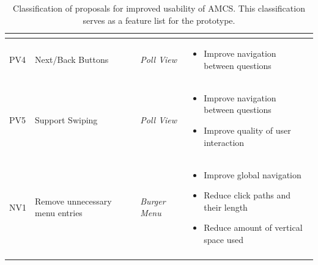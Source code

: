 \begin{longtable}{ | p{0.7cm} | p{2.8cm} | p{2cm} | p{7.6cm} |}
\begin{itemize}[leftmargin=*,noitemsep, topsep=0pt]
	\end{itemize} \vspace{-0.45cm} \\ \hline
	PV4 & Next/Back Buttons & \emph{Poll View} &
	\begin{itemize}[leftmargin=*,noitemsep, topsep=0pt]
		\item Improve navigation between questions
	\end{itemize} \vspace{-0.45cm} \\ \hline
	PV5 & Support Swiping & \emph{Poll View} &
	\vspace{-0.45cm}	
	\begin{itemize}[leftmargin=*,noitemsep, topsep=0pt]
		\item Improve navigation between questions
		\item Improve quality of user interaction
	\end{itemize} \vspace{-0.45cm} \\ \hline
	NV1 & Remove unnecessary menu entries & \emph{Burger Menu} & 		\vspace{-0.45cm}	
	\begin{itemize}[leftmargin=*,noitemsep, topsep=0pt]
		\item Improve global navigation
		\item Reduce click paths and their length
		\item Reduce amount of vertical space used
	\end{itemize} \vspace{-0.45cm} \\ \hline
	
	\caption{Classification of proposals for improved usability of AMCS. This classification serves as a feature list for the prototype.}
	\label{tab:proposals}
\end{longtable}
